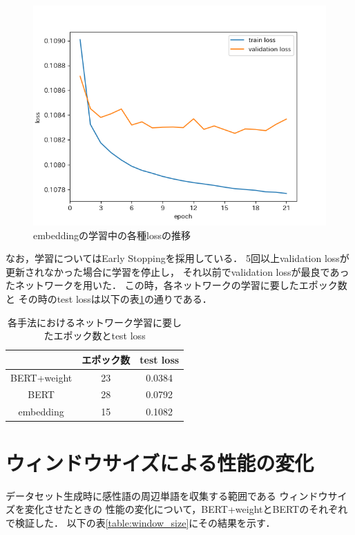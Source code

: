 	\begin{figure}[H]
		\centering
		\includegraphics[keepaspectratio, scale=0.8]{./figure/embeddings.png}
		\caption{embeddingの学習中の各種lossの推移}
		\label{fig:embedding_loss}
	\end{figure}

	なお，学習についてはEarly Stoppingを採用している．
	5回以上validation lossが更新されなかった場合に学習を停止し，
	それ以前でvalidation lossが最良であったネットワークを用いた．
	この時，各ネットワークの学習に要したエポック数と
	その時のtest lossは以下の表\ref{table:epoch_num}の通りである．

	\begin{table}[H]
		\centering
		\caption{各手法におけるネットワーク学習に要したエポック数とtest loss}
		\label{table:epoch_num}
		\begin{tabular}{|c|c|c|}
			\hline
			& エポック数 & test loss \\
			\hline
			BERT+weight & 23 & 0.0384 \\
			\hline
			BERT & 28 & 0.0792 \\
			\hline
			embedding & 15 & 0.1082 \\
			\hline
		\end{tabular}
	\end{table}

\section{ウィンドウサイズによる性能の変化}
	データセット生成時に感性語の周辺単語を収集する範囲である
	ウィンドウサイズを変化させたときの
	性能の変化について，BERT+weightとBERTのそれぞれで検証した．
	以下の表\ref{table:window_size}にその結果を示す．

